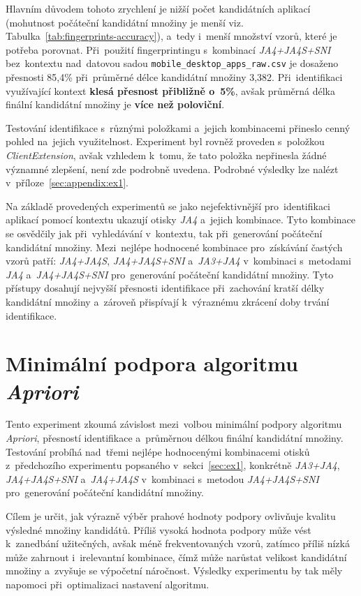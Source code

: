 Hlavním důvodem tohoto zrychlení je nižší počet kandidátních aplikací (mohutnost počáteční kandidátní množiny je menší viz. Tabulka~\ref{tab:fingerprints-accuracy}), a~tedy i~menší množství vzorů, které je potřeba porovnat. Při~použití fingerprintingu s~kombinací \textit{JA4+JA4S+SNI} bez~kontextu nad~datovou sadou \texttt{mobile\_desktop\_apps\_raw.csv} je dosaženo přesnosti 85{,}4\% při~průměrné délce kandidátní množiny 3{,}382. Při~identifikaci využívající kontext \textbf{klesá přesnost přibližně o~5\%}, avšak průměrná délka finální kandidátní množiny je \textbf{více než poloviční}.

Testování identifikace s~různými položkami a~jejich kombinacemi přineslo cenný pohled na~jejich využitelnost. Experiment byl rovněž proveden s~položkou \textit{ClientExtension}, avšak vzhledem k~tomu, že tato položka nepřinesla žádné významné zlepšení, není zde podrobně uvedena. Podrobné výsledky lze nalézt v~příloze~\ref{sec:appendix:ex1}.

Na základě provedených experimentů se jako nejefektivnější pro~identifikaci aplikací pomocí kontextu ukazují otisky \textit{JA4} a~jejich kombinace. Tyto kombinace se osvědčily jak při~vyhledávání v~kontextu, tak při~generování počáteční kandidátní množiny. Mezi~nejlépe hodnocené kombinace pro~získávání častých vzorů patří: \textit{JA4+JA4S}, \textit{JA4+JA4S+SNI} a~\textit{JA3+JA4} v~kombinaci s~metodami \textit{JA4} a~\textit{JA4+JA4S+SNI} pro~generování počáteční kandidátní množiny. Tyto přístupy dosahují nejvyšší přesnosti identifikace při~zachování kratší délky kandidátní množiny a~zároveň přispívají k~výraznému zkrácení doby trvání identifikace.

\section{Minimální podpora algoritmu \textit{Apriori}}
\label{ex-min_sup}
Tento experiment zkoumá závislost mezi~volbou minimální podpory algoritmu \textit{Apriori}, přesností identifikace a~průměrnou délkou finální kandidátní množiny. Testování probíhá nad~třemi nejlépe hodnocenými kombinacemi otisků z~předchozího experimentu popsaného v~sekci~\ref{sec:ex1}, konkrétně \textit{JA3+JA4}, \textit{JA4+JA4S+SNI} a~\textit{JA4+JA4S} v~kombinaci s~metodou \textit{JA4+JA4S+SNI} pro~generování počáteční kandidátní množiny.

Cílem je určit, jak výrazně výběr prahové hodnoty podpory ovlivňuje kvalitu výsledné množiny kandidátů. Příliš vysoká hodnota podpory může vést k~zanedbání užitečných, avšak méně frekventovaných vzorů, zatímco příliš nízká může zahrnout i~irelevantní kombinace, čímž může narůstat velikost kandidátní množiny a~zvyšuje se výpočetní náročnost. Výsledky experimentu by tak měly napomoci při~optimalizaci nastavení algoritmu.

